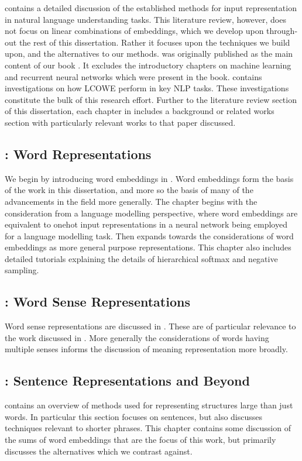 \documentclass{book}
\begin{document}
 contains a detailed discussion of the established methods for input representation in natural language understanding tasks.
This literature review, however, does not focus on linear combinations of embeddings, which we develop upon through-out the rest of this dissertation.
Rather it focuses upon the techniques we build upon, and the alternatives to our methods.
 was originally published as the main content of our book  \citep{NRoNL}.
It excludes the introductory chapters on machine learning and recurrent neural networks which were present in the book.
 contains investigations on how LCOWE perform in key NLP tasks.
These investigations constitute the bulk of this research effort.
Further to the literature review section of this dissertation, each chapter in  includes a background or related works section with particularly relevant works to that paper discussed.



\subsection*{:  Word Representations}
We begin by introducing word embeddings in .
Word embeddings form the basis of the work in this dissertation, and more so the basis of many of the advancements in the field more generally.
The chapter begins with the consideration from a language modelling perspective,
where word embeddings are equivalent to onehot input representations in a neural network being employed for a language modelling task.
Then expands towards the considerations of word embeddings as more general purpose representations.
This chapter also includes detailed tutorials explaining the details of hierarchical softmax and negative sampling.


\subsection*{:  Word Sense Representations}
Word sense representations are discussed in .
These are of particular relevance to the work discussed in .
More generally the considerations of words having multiple senses informs the discussion of meaning representation more broadly.

\subsection*{:  Sentence Representations and Beyond}
 contains an overview of methods used for representing structures large than just words.
In particular this section focuses on sentences, but also discusses techniques relevant to shorter phrases.
This chapter contains some discussion of the sums of word embeddings that are the focus of this work,
but primarily discusses the alternatives which we contrast against.
\end{document}
